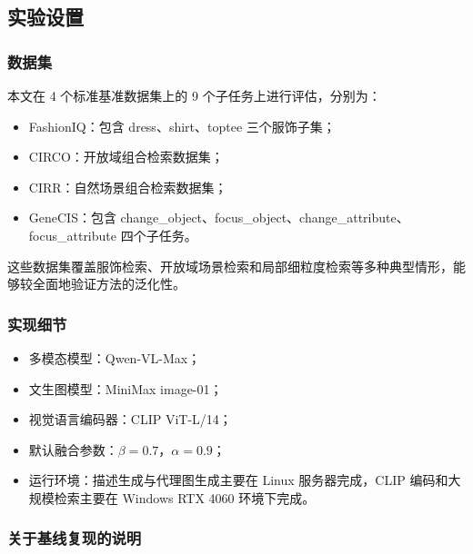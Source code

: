 \documentclass[12pt,a4paper,UTF8,oneside,openany]{ctexrep}
\providecommand{\tightlist}{%
  \setlength{\itemsep}{0pt}\setlength{\parskip}{0pt}}
\begin{document}
\hypertarget{ux5b9eux9a8cux8bbeux7f6e}{%
\subsection{实验设置}\label{ux5b9eux9a8cux8bbeux7f6e}}

\hypertarget{ux6570ux636eux96c6}{%
\subsubsection{数据集}\label{ux6570ux636eux96c6}}

本文在 4 个标准基准数据集上的 9 个子任务上进行评估，分别为：

\begin{itemize}
\tightlist
\item
  FashionIQ：包含 dress、shirt、toptee 三个服饰子集；
\item
  CIRCO：开放域组合检索数据集；
\item
  CIRR：自然场景组合检索数据集；
\item
  GeneCIS：包含
  change\_object、focus\_object、change\_attribute、focus\_attribute
  四个子任务。
\end{itemize}

这些数据集覆盖服饰检索、开放域场景检索和局部细粒度检索等多种典型情形，能够较全面地验证方法的泛化性。

\hypertarget{ux5b9eux73b0ux7ec6ux8282}{%
\subsubsection{实现细节}\label{ux5b9eux73b0ux7ec6ux8282}}

\begin{itemize}
\tightlist
\item
  多模态模型：Qwen-VL-Max；
\item
  文生图模型：MiniMax image-01；
\item
  视觉语言编码器：CLIP ViT-L/14；
\item
  默认融合参数：\(\beta=0.7\)，\(\alpha=0.9\)；
\item
  运行环境：描述生成与代理图生成主要在 Linux 服务器完成，CLIP
  编码和大规模检索主要在 Windows RTX 4060 环境下完成。
\end{itemize}

\hypertarget{ux5173ux4e8eux57faux7ebfux590dux73b0ux7684ux8bf4ux660e}{%
\subsubsection{关于基线复现的说明}\label{ux5173ux4e8eux57faux7ebfux590dux73b0ux7684ux8bf4ux660e}}
\end{document}

